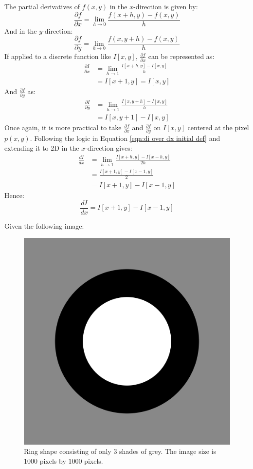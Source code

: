 \documentclass{article}
\begin{document}
The partial derivatives of $f(x,y)$ in the $x$-direction is given by:
\begin{equation}
    \frac{\partial f}{\partial x} = \lim_{h \to 0}{\frac{f(x+h, y) - f(x, y)}{h}}
\end{equation}
And in the $y$-direction:
\begin{equation}
    \frac{\partial f}{\partial y} = \lim_{h \to 0}{\frac{f(x, y+h) - f(x, y)}{h}}
\end{equation}
If applied to a discrete function like $I[x,y]$, $\frac{\partial f}{\partial x}$ can be represented as:
\begin{align}
    \frac{\partial I}{\partial x} &= \lim_{h \to 1}{\frac{I[x+h, y] - I[x, y]}{h}} \nonumber \\
    &= I[x+1, y] = I[x,y]
\end{align}
And $\frac{\partial f}{\partial y}$ as:
\begin{align}
    \frac{\partial I}{\partial y} &= \lim_{h \to 1}{\frac{I[x, y+h] - I[x, y]}{h}} \nonumber \\
    &= I[x, y+1] - I[x, y]
\end{align}
Once again, it is more practical to take $\frac{\partial f}{\partial x}$ and $\frac{\partial f}{\partial y}$ on $I[x, y]$ centered at the pixel $p(x, y)$. Following the logic in Equation \eqref{eqn:di over dx initial def} and extending it to 2D in the $x$-direction gives:
\begin{align}
    \frac{dI}{dx} &= \lim_{h \to 1}{\frac{I[x+h, y] - I[x-h, y]}{2h}} \nonumber \\
    &= \frac{I[x+1, y] - I[x-1, y]}{2} \nonumber \\
    &= I[x+1, y] - I[x-1, y]
    \label{eqn:di over dx initial def 2d}
\end{align}
Hence:
\begin{equation}
    \frac{dI}{dx} = I[x+1, y] - I[x-1, y]
\end{equation}

\newpage

Given the following image:

\begin{figure}[!hbtp]
    \centering
    \includegraphics[width=0.5\linewidth]{figures/figure06.png}
    \caption[Ring shape consisting of only 3 shades of grey]{Ring shape consisting of only 3 shades of grey. The image size is 1000 pixels by 1000 pixels.}
    \label{fig:figur 6}
\end{figure}
\end{document}
